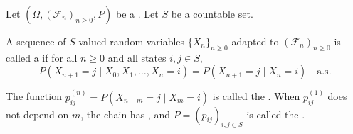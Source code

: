 \begin{definition} \label{definition:discrete_time_markov_chain_on_a_countable_state_space}
Let $(\Omega, (\mathcal{F}_n)_{n \geq 0}, P)$ be a . Let $S$ be a countable set.

A sequence of $S$-valued random variables $\{X_n\}_{n \geq 0}$ adapted to $(\mathcal{F}_n)_{n \geq 0}$ is called a  if for all $n \geq 0$ and all states $i, j \in S$,
$$P(X_{n+1} = j \mid X_0, X_1, \dots, X_n = i) = P(X_{n+1} = j \mid X_n = i) \quad \text{a.s.}$$

The function $p_{ij}^{(n)} = P(X_{n+m} = j \mid X_m = i)$ is called the . When $p_{ij}^{(1)}$ does not depend on $m$, the chain has , and $P = (p_{ij})_{i,j \in S}$ is called the .
\end{definition}
